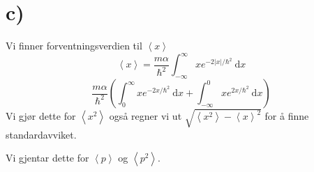 \documentclass{article}
\begin{document}
  \section*{c)}
  Vi finner forventningsverdien til $\left<x\right>$
  \[
  \left<x\right> =\frac{mα}{ℏ^2}  ∫_{-∞}^{∞} x e^{-2 \left|x\right| / ℏ^2} \ \mathrm{d}x 
  \]
  \[
  \frac{mα}{ℏ^2} \left( ∫_{0}^{∞} xe^{-2x / ℏ^2} \ \mathrm{d}x + ∫_{-∞}^{0} xe^{2x / ℏ^2} \ \mathrm{d}x \right)
  \]
  Vi gjør dette for $\left<x^2\right>$ også regner vi ut $\sqrt{\left<x^2\right> - \left<x\right>^2}$ for å finne standardavviket.
  
  Vi gjentar dette for $\left<p\right>$ og $\left<p^2\right>$. 
  

    
    
    
\end{document}
